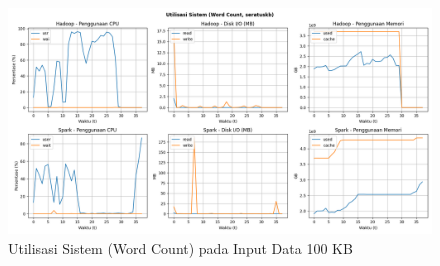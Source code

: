 \begin{figure}[h]
    \centering
    \includegraphics[width=1\textwidth]{figures/ch04/5-util-sistem-wordcount-seratuskb}
    \caption{Utilisasi Sistem (Word Count) pada Input Data 100 KB}
    \label{fig:5-util-sistem-wordcount-seratuskb}
\end{figure}

%
%
%

